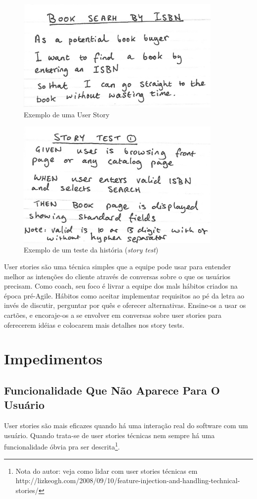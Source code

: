 \documentclass[a4paper, 10pt, font=plain]{abnt}
\begin{document}
\begin{figure}[h]
  \centering
  \includegraphics[width=10cm]{user_story}
  \caption{Exemplo de uma User Story}
\end{figure}

\begin{figure}[h]
  \centering
  \includegraphics[width=10cm]{story_test}
  \caption{Exemplo de um teste da história (\textit{story test})}
\end{figure}


User stories são uma técnica simples que a equipe pode usar para entender melhor as intenções do cliente através de conversas sobre o que os usuários precisam. Como coach, seu foco é livrar a equipe dos mals hábitos criados na época pré-Agile. Hábitos como aceitar implementar requisitos ao pé da letra ao invés de discutir, perguntar por quês e oferecer alternativas. Ensine-os a usar os cartões, e encoraje-os a se envolver em conversas sobre user stories para oferecerem idéias e colocarem mais detalhes nos story tests.



\section{Impedimentos}

\subsection{Funcionalidade Que Não Aparece Para O Usuário}
User stories são mais eficazes quando há uma interação real do software com um usuário. Quando trata-se de user stories técnicas nem sempre há uma funcionalidade óbvia pra ser descrita\footnote{Nota do autor: veja como lidar com user stories técnicas em http://lizkeogh.com/2008/09/10/feature-injection-and-handling-technical-stories/}.
\end{document}
